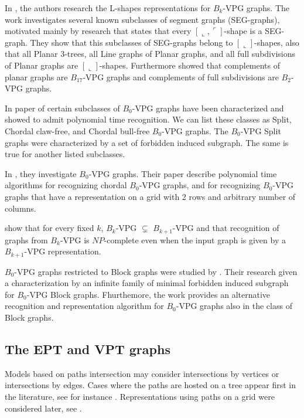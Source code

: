 In \citet{felsner2016intersection}, the authors research the L-shapes representations for $B_k$-VPG graphs. The work investigates several known subclasses of segment graphs (SEG-graphs), motivated mainly by research \cite{middendorf1992max} that states that every $[\llcorner, \ulcorner]$-shape is a SEG-graph.
They show that this subclasses of SEG-graphs belong to $[\llcorner]$-shapes, also that all Planar 3-trees, all Line graphs of Planar graphs, and all full subdivisions of Planar graphs are $[\llcorner]$-shapes. Furthermore \cite{felsner2016intersection} showed that complements of planar graphs are $B_{17}$-VPG graphs and complements of full subdivisions are $B_2$-VPG graphs. 

In paper of \citet{golumbic2013intersection} certain subclasses of $B_0$-VPG graphs have been characterized and showed to admit polynomial time recognition. We can list these classes as Split, Chordal claw-free, and Chordal bull-free $B_0$-VPG graphs.
The $B_0$-VPG Split graphs were characterized by  a set of forbidden induced subgraph. The same is true for another listed subclasses.


In \citet{chaplick2011recognizing}, they investigate  $B_0$-VPG graphs. Their paper describe polynomial time
algorithms for recognizing chordal $B_0$-VPG graphs, and for recognizing $B_0$-VPG graphs that have a representation on a grid with 2 rows and arbitrary number of columns.

\citet{chaplick2012bend} show  that for every fixed $k$, $B_k$-VPG $\subsetneq$ $B_{k+1}$-VPG and that recognition of graphs from $B_k$-VPG is $NP$-complete even when the input graph is given by a $B_{k+1}$-VPG representation. 


$B_0$-VPG graphs restricted to Block graphs were studied by \citet{Alcn2017VertexIG}. Their research given a characterization by an infinite family of minimal forbidden induced subgraph  for $B_0$-VPG Block graphs. Fhurthemore, the work provides an alternative recognition and representation algorithm for $B_0$-VPG graphs also in the class of Block graphs.





\subsection{The EPT and VPT graphs}

Models based on paths intersection  may consider  intersections by vertices or   intersections by edges.  Cases where the paths are hosted on a tree  appear first in the literature, see for instance \cite{gavril1978recognition, golumbic1985edge, golumbic1985}.  Representations using paths on a grid were considered later, see  \cite{golumbic2009,golumbic2013, golumbic2013intersection}.

